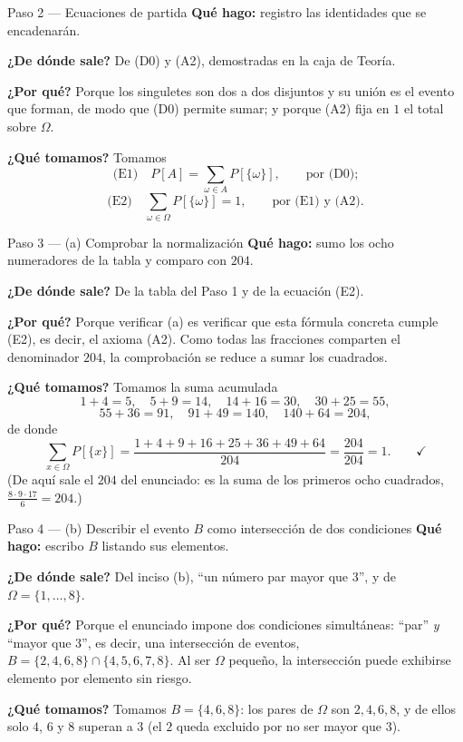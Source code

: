 \documentclass[11pt]{article}
\begin{document}
\begin{sol}
\begin{paso}{Paso 2 --- Ecuaciones de partida}
\textbf{Qué hago:} registro las identidades que se encadenarán.

\textbf{¿De dónde sale?} De (D0) y (A2), demostradas en la caja de Teoría.

\textbf{¿Por qué?} Porque los singuletes son dos a dos disjuntos y su unión es el evento que
forman, de modo que (D0) permite sumar; y porque (A2) fija en $1$ el total sobre $\Omega$.

\textbf{¿Qué tomamos?} Tomamos
\[
\text{(E1)}\quad P[A]=\sum_{\omega\in A}P[\{\omega\}],\qquad\text{por (D0);}
\]
\[
\text{(E2)}\quad \sum_{\omega\in\Omega}P[\{\omega\}]=1,\qquad\text{por (E1) y (A2).}
\]
\end{paso}

\begin{paso}{Paso 3 --- (a) Comprobar la normalización}
\textbf{Qué hago:} sumo los ocho numeradores de la tabla y comparo con $204$.

\textbf{¿De dónde sale?} De la tabla del Paso 1 y de la ecuación (E2).

\textbf{¿Por qué?} Porque verificar (a) es verificar que esta fórmula concreta cumple (E2), es
decir, el axioma (A2). Como todas las fracciones comparten el denominador $204$, la comprobación
se reduce a sumar los cuadrados.

\textbf{¿Qué tomamos?} Tomamos la suma acumulada
\[
1+4=5,\quad 5+9=14,\quad 14+16=30,\quad 30+25=55,
\]
\[
55+36=91,\quad 91+49=140,\quad 140+64=204 ,
\]
de donde
\[
\sum_{x\in\Omega}P[\{x\}]=\frac{1+4+9+16+25+36+49+64}{204}=\frac{204}{204}=1 . \qquad\checkmark
\]
(De aquí sale el $204$ del enunciado: es la suma de los primeros ocho cuadrados,
$\frac{8\cdot 9\cdot 17}{6}=204$.)
\end{paso}

\begin{paso}{Paso 4 --- (b) Describir el evento $B$ como intersección de dos condiciones}
\textbf{Qué hago:} escribo $B$ listando sus elementos.

\textbf{¿De dónde sale?} Del inciso (b), ``un número par mayor que 3'', y de
$\Omega=\{1,\dots,8\}$.

\textbf{¿Por qué?} Porque el enunciado impone dos condiciones simultáneas: ``par'' \emph{y}
``mayor que 3'', es decir, una intersección de eventos,
$B=\{2,4,6,8\}\cap\{4,5,6,7,8\}$. Al ser $\Omega$ pequeño, la intersección puede exhibirse
elemento por elemento sin riesgo.

\textbf{¿Qué tomamos?} Tomamos $B=\{4,6,8\}$: los pares de $\Omega$ son $2,4,6,8$, y de ellos
solo $4$, $6$ y $8$ superan a $3$ (el $2$ queda excluido por no ser mayor que $3$).
\end{paso}


\end{sol}
\end{document}
